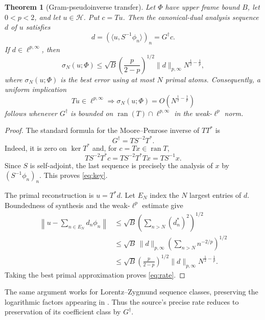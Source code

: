 \documentclass[11pt]{article}
\newtheorem{theorem}{Theorem}
\newcommand{\Hh}{\mathcal H}
\newcommand{\ran}{\operatorname{ran}}
\begin{document}
\begin{theorem}[Gram-pseudoinverse transfer]\label{thm:transfer}
Let $\Phi$ have upper frame bound $B$, let $0<p<2$, and let $u\in\Hh$.
Put $c=Tu$.  Then the canonical-dual analysis sequence $d$ of $u$ satisfies
\begin{equation}\label{eq:key}
 d=(\langle u,S^{-1}\phi_n\rangle)_n=G^\dagger c.
\end{equation}
If $d\in\ell^{p,\infty}$, then
\begin{equation}\label{eq:rate}
 \sigma_N(u;\Phi)
 \le \sqrt{B}\left(\frac{p}{2-p}\right)^{1/2}
       \|d\|_{p,\infty}N^{\frac12-\frac1p},
\end{equation}
where $\sigma_N(u;\Phi)$ is the best error using at most $N$ primal atoms.
Consequently, a uniform implication
\[
 Tu\in\ell^{p,\infty}\Longrightarrow
 \sigma_N(u;\Phi)=O(N^{\frac12-\frac1p})
\]
follows whenever $G^\dagger$ is bounded on
$\ran(T)\cap\ell^{p,\infty}$ in the weak-$\ell^p$ norm.
\end{theorem}

\begin{proof}
The standard formula for the Moore--Penrose inverse of $TT^*$ is
\begin{equation}\label{eq:mp}
 G^\dagger=TS^{-2}T^*.
\end{equation}
Indeed, it is zero on $\ker T^*$ and, for $c=Tx\in\ran T$,
\[
 TS^{-2}T^*c=TS^{-2}T^*Tx=TS^{-1}x.
\]
Since $S$ is self-adjoint, the last sequence is precisely the analysis of
$x$ by $(S^{-1}\phi_n)_n$.  This proves \eqref{eq:key}.

The primal reconstruction is $u=T^*d$.  Let $E_N$ index the $N$ largest
entries of $d$.  Boundedness of synthesis and the weak-$\ell^p$ estimate give
\begin{align*}
 \left\|u-\sum_{n\in E_N}d_n\phi_n\right\|
 &\le \sqrt B\left(\sum_{n>N}(d_n^*)^2\right)^{1/2}\\
 &\le \sqrt B\,\|d\|_{p,\infty}
       \left(\sum_{n>N}n^{-2/p}\right)^{1/2}\\
 &\le \sqrt B\left(\frac{p}{2-p}\right)^{1/2}
       \|d\|_{p,\infty}N^{\frac12-\frac1p}.
\end{align*}
Taking the best primal approximation proves \eqref{eq:rate}.
\end{proof}

The same argument works for Lorentz--Zygmund sequence classes, preserving the
logarithmic factors appearing in \cite{PR}.  Thus the source's precise rate
reduces to preservation of its coefficient class by $G^\dagger$.
\end{document}
